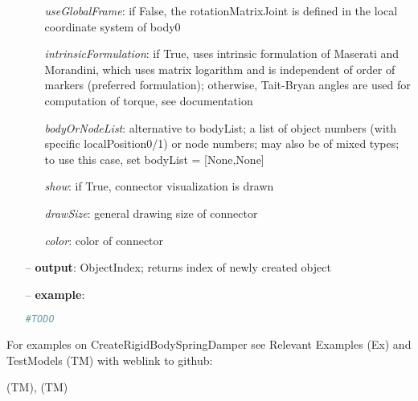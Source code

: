 \begin{itemize}[leftmargin=0.7cm]
\begin{itemize}[leftmargin=1.2cm]
\item[]{\it useGlobalFrame}: if False, the rotationMatrixJoint is defined in the local coordinate system of body0
\item[]{\it intrinsicFormulation}: if True, uses intrinsic formulation of Maserati and Morandini, which uses matrix logarithm and is independent of order of markers (preferred formulation); otherwise, Tait-Bryan angles are used for computation of torque, see documentation
\item[]{\it bodyOrNodeList}: alternative to bodyList; a list of object numbers (with specific localPosition0/1) or node numbers; may also be of mixed types; to use this case, set bodyList = [None,None]
\item[]{\it show}: if True, connector visualization is drawn
\item[]{\it drawSize}: general drawing size of connector
\item[]{\it color}: color of connector
\end{itemize}
\item[--]
{\bf output}: ObjectIndex; returns index of newly created object
\item[--]
{\bf example}: \vspace{-12pt}\ei\begin{lstlisting}[language=Python, xleftmargin=36pt]
  #TODO
\end{lstlisting}\vspace{-24pt}\bi\item[]\vspace{-24pt}\vspace{12pt}\end{itemize}
%

%
\noindent For examples on CreateRigidBodySpringDamper see Relevant Examples (Ex) and TestModels (TM) with weblink to github:
\bi
 \item \footnotesize {} (TM), 
 (TM)
\ei


